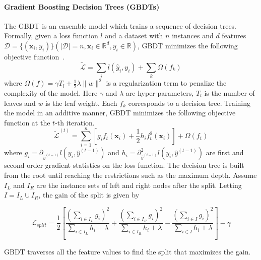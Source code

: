 \documentclass[letterpaper]{article} %
\theoremstyle{definition}
\newcommand\norm[1]{\lVert#1\rVert}
\begin{document}
\paragraph{Gradient Boosting Decision Trees (GBDTs)}
The GBDT is an ensemble model which trains a sequence of decision trees. Formally, given a loss function $l$ and a dataset with $n$ instances and $d$ features $\mathcal{D}=\{(\mathbf{x}_i, y_i)\} (|\mathcal{D}|=n, \mathbf{x}_i\in \mathbb{R}^d, y_i\in \mathbb{R})$, 
GBDT minimizes the following objective function~\cite{chen2016xgboost}.
\begin{equation}
    \mathcal{\tilde{L}} = \sum_il(\hat{y}_i,y_i)+\sum_k \Omega(f_k) 
\end{equation}
where $\Omega(f)= \gamma T_l + \frac{1}{2}\lambda \norm{w}^2$ is a regularization term to penalize the complexity of the model. Here $\gamma$ and $\lambda$ are hyper-parameters, $T_l$ is the number of leaves and $w$ is the leaf weight. Each $f_k$ corresponds to a decision tree. 
Training the model in an additive manner, GBDT minimizes the following objective function at the $t$-th iteration.
\begin{equation}
    \mathcal{\tilde{L}}^{(t)} = \sum_{i=1}^{n} [g_i f_t(\mathbf{x}_i)+\frac{1}{2}h_i f_t^2(\mathbf{x}_i)]+\Omega(f_t)
\label{eq:xg_loss}
\end{equation}
where $g_i = \partial_{\hat{y}^{(t-1)}}l(y_i,\hat{y}^{(t-1)})$ and $h_i = \partial_{\hat{y}^{(t-1)}}^2l(y_i,\hat{y}^{(t-1)})$ are first and second order gradient statistics on the loss function. The decision tree is built from the root until reaching the restrictions such as the maximum depth. Assume $I_L$ and $I_R$ are the instance sets of left and right nodes after the split. Letting $I = I_L \cup I_R$, the gain of the split is given by
\begin{small}
\begin{equation}
    \mathcal{L}_{split} = \frac{1}{2}[\frac{(\sum_{i\in I_L}g_i)^2}{\sum_{i\in I_L}h_i+\lambda}+\frac{(\sum_{i\in I_R}g_i)^2}{\sum_{i\in I_R}h_i+\lambda}-
    \frac{(\sum_{i\in I}g_i)^2}{\sum_{i\in I}h_i+\lambda}]-\gamma
\label{eq:gain}
\end{equation}
\end{small}

GBDT traverses all the feature values to find the split that maximizes the gain.
\end{document}
